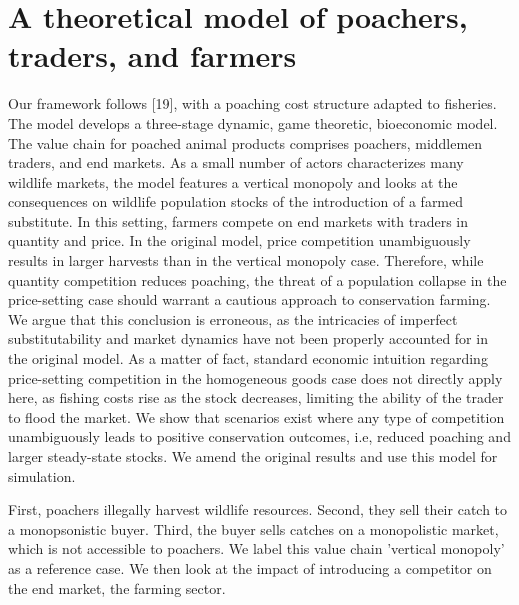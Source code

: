 \section{A theoretical model of poachers, traders, and farmers}

Our framework follows [19], with a poaching cost structure adapted to fisheries. The model develops a three-stage dynamic, game theoretic, bioeconomic model. The value chain for poached animal products comprises poachers, middlemen traders, and end markets. As a small number of actors characterizes many wildlife markets, the model features a vertical monopoly and looks at the consequences on wildlife population stocks of the introduction of a farmed substitute. In this setting, farmers compete on end markets with traders in quantity and price. In the original model, price competition unambiguously results in larger harvests than in the vertical monopoly case. Therefore, while quantity competition reduces poaching, the threat of a population collapse in the price-setting case should warrant a cautious approach to conservation farming. We argue that this conclusion is erroneous, as the intricacies of imperfect substitutability and market dynamics have not been properly accounted for in the original model. As a matter of fact, standard economic intuition regarding price-setting competition in the homogeneous goods case does not directly apply here, as fishing costs rise as the stock decreases, limiting the ability of the trader to flood the market. We show that scenarios exist where any type of competition unambiguously leads to positive conservation outcomes, i.e, reduced poaching and larger steady-state stocks. We amend the original results and use this model for simulation. 

First, poachers illegally harvest wildlife resources. Second, they sell their catch to a monopsonistic buyer. Third, the buyer sells catches on a monopolistic market, which is not accessible to poachers. We label this value chain 'vertical monopoly' as a reference case. We then look at the impact of introducing a competitor on the end market, the farming sector. 



